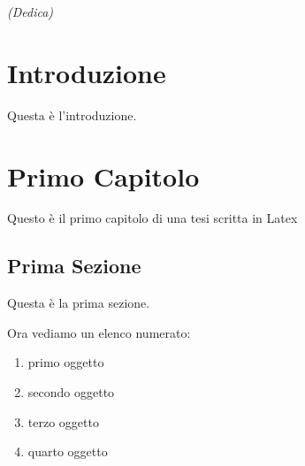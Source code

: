 \documentclass[12pt,a4paper,openright,twoside]{report}
\begin{document}
\clearpage{\pagestyle{empty}\cleardoublepage}

\newpage

\begin{titlepage}
\thispagestyle{empty}
\topmargin=6.5cm
\raggedleft
\large
\em
(Dedica)
\clearpage{\pagestyle{empty}\cleardoublepage}
\end{titlepage}

\chapter*{Introduzione}


Questa \`e l'introduzione.




\tableofcontents

\rhead[\fancyplain{}{\bfseries\leftmark}]{\fancyplain{}{\bfseries\thepage}}

\clearpage{\pagestyle{empty}\cleardoublepage}

\listoffigures
\clearpage{\pagestyle{empty}\cleardoublepage}

\listoftables
\clearpage{\pagestyle{empty}\cleardoublepage}




\clearpage{\pagestyle{empty}\cleardoublepage}
\chapter{Primo Capitolo}

\lhead[\fancyplain{}{\bfseries\thepage}]{\fancyplain{}{\bfseries\rightmark}}
Questo \`e il primo capitolo di una tesi scritta in Latex ~\cite{latex}
\section{Prima Sezione}
Questa \`e la prima sezione.

Ora vediamo un elenco numerato:
\begin{enumerate}
\item primo oggetto
\item secondo oggetto
\item terzo oggetto
\item quarto oggetto
\end{enumerate}
\end{document}
